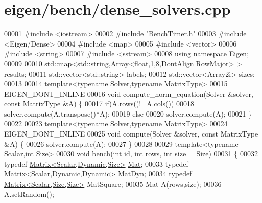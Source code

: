 \hypertarget{eigen_2bench_2dense__solvers_8cpp_source}{}\section{eigen/bench/dense\+\_\+solvers.cpp}
\label{eigen_2bench_2dense__solvers_8cpp_source}

\begin{DoxyCode}
00001 \textcolor{preprocessor}{#include <iostream>}
00002 \textcolor{preprocessor}{#include "BenchTimer.h"}
00003 \textcolor{preprocessor}{#include <Eigen/Dense>}
00004 \textcolor{preprocessor}{#include <map>}
00005 \textcolor{preprocessor}{#include <vector>}
00006 \textcolor{preprocessor}{#include <string>}
00007 \textcolor{preprocessor}{#include <sstream>}
00008 \textcolor{keyword}{using namespace }\hyperlink{namespace_eigen}{Eigen};
00009 
00010 std::map<std::string,Array<float,1,8,DontAlign|RowMajor> > results;
00011 std::vector<std::string> labels;
00012 std::vector<Array2i> sizes;
00013 
00014 \textcolor{keyword}{template}<\textcolor{keyword}{typename} Solver,\textcolor{keyword}{typename} MatrixType>
00015 EIGEN\_DONT\_INLINE
00016 \textcolor{keywordtype}{void} compute\_norm\_equation(Solver &solver, \textcolor{keyword}{const} MatrixType &\hyperlink{group___core___module_class_eigen_1_1_matrix}{A}) \{
00017   \textcolor{keywordflow}{if}(A.rows()!=A.cols())
00018     solver.compute(A.transpose()*A);
00019   \textcolor{keywordflow}{else}
00020     solver.compute(A);
00021 \}
00022 
00023 \textcolor{keyword}{template}<\textcolor{keyword}{typename} Solver,\textcolor{keyword}{typename} MatrixType>
00024 EIGEN\_DONT\_INLINE
00025 \textcolor{keywordtype}{void} compute(Solver &solver, \textcolor{keyword}{const} MatrixType &A) \{
00026   solver.compute(A);
00027 \}
00028 
00029 \textcolor{keyword}{template}<\textcolor{keyword}{typename} Scalar,\textcolor{keywordtype}{int} Size>
00030 \textcolor{keywordtype}{void} bench(\textcolor{keywordtype}{int} \textcolor{keywordtype}{id}, \textcolor{keywordtype}{int} rows, \textcolor{keywordtype}{int} size = Size)
00031 \{
00032   \textcolor{keyword}{typedef} \hyperlink{group___core___module_class_eigen_1_1_matrix}{Matrix<Scalar,Dynamic,Size>} \hyperlink{group___core___module}{Mat};
00033   \textcolor{keyword}{typedef} \hyperlink{group___core___module}{Matrix<Scalar,Dynamic,Dynamic>} MatDyn;
00034   \textcolor{keyword}{typedef} \hyperlink{group___core___module_class_eigen_1_1_matrix}{Matrix<Scalar,Size,Size>} MatSquare;
00035   Mat A(rows,size);
00036   A.setRandom();

\end{DoxyCode}
